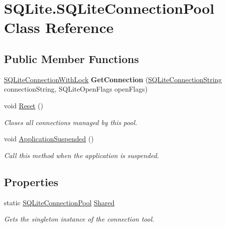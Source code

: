 \hypertarget{classSQLite_1_1SQLiteConnectionPool}{}\section{S\+Q\+Lite.\+S\+Q\+Lite\+Connection\+Pool Class Reference}
\label{classSQLite_1_1SQLiteConnectionPool}
\subsection*{Public Member Functions}
\begin{DoxyCompactItemize}
\item 
\hypertarget{classSQLite_1_1SQLiteConnectionPool_a956aa90143a106ef4344ac2a77bfeefc}{}\hyperlink{classSQLite_1_1SQLiteConnectionWithLock}{S\+Q\+Lite\+Connection\+With\+Lock} {\bfseries Get\+Connection} (\hyperlink{classSQLite_1_1SQLiteConnectionString}{S\+Q\+Lite\+Connection\+String} connection\+String, S\+Q\+Lite\+Open\+Flags open\+Flags)\label{classSQLite_1_1SQLiteConnectionPool_a956aa90143a106ef4344ac2a77bfeefc}

\item 
void \hyperlink{classSQLite_1_1SQLiteConnectionPool_a06bf58eb2050f2bb058c5bbfe76fab5e}{Reset} ()
\begin{DoxyCompactList}\small\item\em Closes all connections managed by this pool. \end{DoxyCompactList}\item 
void \hyperlink{classSQLite_1_1SQLiteConnectionPool_a1ad83ea08efbe20c5f596d82977fffe9}{Application\+Suspended} ()
\begin{DoxyCompactList}\small\item\em Call this method when the application is suspended. \end{DoxyCompactList}\end{DoxyCompactItemize}
\subsection*{Properties}
\begin{DoxyCompactItemize}
\item 
static \hyperlink{classSQLite_1_1SQLiteConnectionPool}{S\+Q\+Lite\+Connection\+Pool} \hyperlink{classSQLite_1_1SQLiteConnectionPool_aaa23c37a087e3e04c4af6a69ce7cfb97}{Shared}
\begin{DoxyCompactList}\small\item\em Gets the singleton instance of the connection tool. \end{DoxyCompactList}\end{DoxyCompactItemize}


